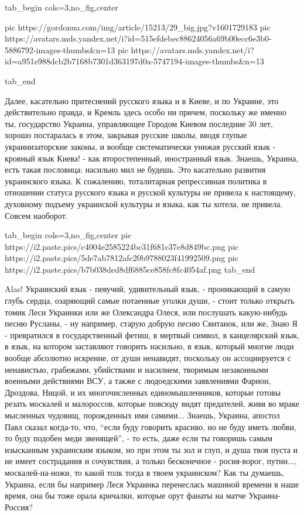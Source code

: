 \ifcmt
  tab_begin cols=3,no_fig,center

     pic https://gordonua.com/img/article/15213/29_big.jpg?v1601729183
		 pic https://avatars.mds.yandex.net/i?id=515efdebec88624056a69b00ecc6e3b0-5886792-images-thumbs&n=13
		 pic https://avatars.mds.yandex.net/i?id=a951e988dcb2b7168b7301d363197d0a-5747194-images-thumbs&n=13

  tab_end
\fi

Далее, касательно притеснений русского языка и в Киеве, и по Украине, это
действительно правда, и Кремль здесь особо ни причем, поскольку же именно ты,
государство Украина, управляющее Городом Киевом последние 30 лет, хорошо
постаралась в этом, закрывая русские школы, вводя глупые украинизаторские
законы, и вообще систематически унижая русский язык - кровный язык Киева! - как
второстепенный, иностранный язык.  Знаешь, Украина, есть такая пословица:
насильно мил не будешь. Это касательно развития украинского языка. К сожалению,
тоталитарная репрессивная политика в отношении статуса русского языка и русской
культуры не привела к настоящему, духовному подъему украинской культуры и
языка, как ты хотела, не привела. Совсем наоборот.

\ifcmt
  tab_begin cols=3,no_fig,center
     pic https://i2.paste.pics/c4004e2585224bc31f681c37e8d849bc.png
		 pic https://i2.paste.pics/5de7ab7812afc20b9788023f41992509.png
		 pic https://i2.paste.pics/b7b038ded8df6885ce858fc8fc4054af.png
  tab_end
\fi

Alas! Украинский язык - певучий, удивительный язык, - проникающий в самую глубь
сердца, озаряющий самые потаенные уголки души, - стоит только открыть томик
Леси Украинки или же Олександра Олеся, или послушать какую-нибудь песню
Русланы, - ну например, старую добрую песню Свитанок, или же, Знаю Я -
превратился в государственный фетиш, в мертвый символ, в канцелярский язык, в
язык, на котором заставляют говорить насильно, в язык, который многие люди
вообще абсолютно искренне, от души ненавидят, поскольку он ассоциируется с
ненавистью, грабежами, убийствами и насилием, творимым незаконными военными
действиями ВСУ, а также с людоедскими заявлениями Фарион, Дроздова, Ницой, и их
многочисленных единомышленников, которые готовы резать москалей и малороссов,
которые повсюду видят предателей, живя во мраке мысленных чудовищ, порожденных
ими самими... Знаешь, Украина, апостол Павл сказал когда-то, что, \enquote{если
буду говорить красиво, но не буду иметь любви, то буду подобен меди звенящей},
- то есть, даже если ты говоришь самым изысканным украинским языком, но при
этом ты зол и глуп, и душа твоя пуста и не имеет сострадания и сочувствия, а
только бесконечное - росия-ворог, путин..., москалей-на-ножи, то какой толк
тогда в твоем украинском? Как ты думаешь, Украина, если бы например Леся Украинка перенеслась
машиной времени в наше время, она бы тоже орала кричалки, которые орут фанаты
на матче Украина-Россия?

